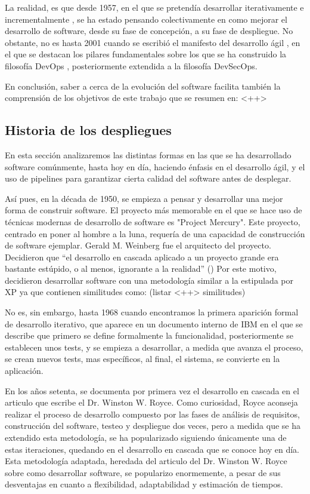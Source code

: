 \documentclass[12pt]{report} %
\begin{document}
La realidad, es que desde 1957, en el que se pretendía desarrollar
iterativamente e incrementalmente \cite{IID}, se ha estado pensando
colectivamente en como mejorar el desarrollo de software, desde su fase de
concepción, a su fase de despliegue.  No obstante, no es hasta 2001 cuando se
escribió el manifesto del desarrollo ágil \cite{agile}, en el que se destacan
los pilares fundamentales sobre los que se ha construido la filosofía DevOps
\cite{CD-TF}, posteriormente extendida a la filosofía DevSecOps.

En conclusión, saber a cerca de la evolución del software facilita también la
comprensión de los objetivos de este trabajo que se resumen en: <++> 


\subsection{Historia de los despliegues}

En esta sección analizaremos las distintas formas en las que se ha desarrollado
software comúnmente, hasta hoy en día, haciendo énfasis en el desarrollo ágil, y
el uso de \Gls{pipeline}s para garantizar cierta calidad del software antes de
desplegar.

Así pues, en la década de 1950, se empieza a pensar y desarrollar una mejor
forma de construir software.  El proyecto más memorable en el que se hace uso de
técnicas modernas de desarrollo de software es "Project Mercury".  Este
proyecto, centrado en poner al hombre a la luna, requería de una capacidad de
construcción de software ejemplar.  Gerald M. Weinberg fue el arquitecto del
proyecto.  Decidieron que ``el desarrollo en cascada aplicado a un proyecto
grande era bastante estúpido, o al menos, ignorante a la realidad''
(\cite{GW-PM}) Por este motivo, decidieron desarrollar software con una
metodología similar a la estipulada por XP \nocite{XP} ya que contienen
similitudes como: (listar <++> similitudes)

No es, sin embargo, hasta 1968 cuando encontramos la primera aparición formal de
desarrollo iterativo, que aparece en un documento interno de IBM en el que se
describe que primero se define formalmente la funcionalidad, posteriormente se
establecen unos tests, y se empieza a desarrollar, a medida que avanza el
proceso, se crean nuevos tests, mas específicos, al final, el sistema, se
convierte en la aplicación. \cite{ID-FB}

En los años setenta, se documenta por primera vez el desarrollo en cascada en el
articulo que escribe el Dr. Winston W. Royce.  Como curiosidad, Royce aconseja
realizar el proceso de desarrollo compuesto por las fases de análisis de
requisitos, construcción del software, testeo y despliegue dos veces, pero a
medida que se ha extendido esta metodología, se ha popularizado siguiendo
únicamente una de estas iteraciones, quedando en el desarrollo en cascada que se
conoce hoy en día. \cite{royce1970} Esta metodología adaptada, heredada del
articulo del Dr. Winston W. Royce sobre como desarrollar software, se popularizo
enormemente, a pesar de sus desventajas en cuanto a flexibilidad, adaptabilidad
y estimación de tiempos.
\end{document}
